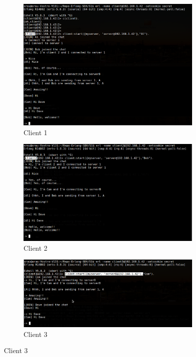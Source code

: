 \documentclass[a4paper, 11pt]{article}
\begin{document}
\begin{figure}[ht]
    \centering
        \begin{subfigure}[b]{0.8\textwidth}
        \caption{Client 1}
        \includegraphics[width=1.0\textwidth]{figures/Al.png}
    \end{subfigure}
    
    \begin{subfigure}[b]{0.8\textwidth}
        \caption{Client 2}
        \includegraphics[width=1.0\textwidth]{figures/Bob.png}
    \end{subfigure}    
    
    
    \begin{subfigure}[b]{0.8\textwidth}
        \caption{Client 3}
        \includegraphics[width=1.0\textwidth]{figures/Cam.png}
    \end{subfigure}    
        

\end{figure}
\end{document}
